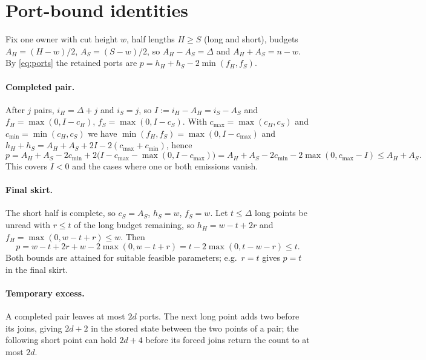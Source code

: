 \section{Port-bound identities}
\label{app:ports}

Fix one owner with cut height $w$, half lengths $H\ge S$ (long and short),
budgets $A_H=(H-w)/2$, $A_S=(S-w)/2$, so $A_H-A_S=\Delta$ and $A_H+A_S=n-w$.
By \eqref{eq:ports} the retained ports are $p=h_H+h_S-2\min(f_H,f_S)$.

\paragraph{Completed pair.}
After $j$ pairs, $i_H=\Delta+j$ and $i_S=j$, so $I:=i_H-A_H=i_S-A_S$ and
$f_H=\max(0,I-c_H)$, $f_S=\max(0,I-c_S)$. With $c_{\max}=\max(c_H,c_S)$ and
$c_{\min}=\min(c_H,c_S)$ we have $\min(f_H,f_S)=\max(0,I-c_{\max})$ and
$h_H+h_S=A_H+A_S+2I-2(c_{\max}+c_{\min})$, hence
\[
 p=A_H+A_S-2c_{\min}+2\bigl(I-c_{\max}-\max(0,I-c_{\max})\bigr)
  =A_H+A_S-2c_{\min}-2\max(0,c_{\max}-I)\le A_H+A_S .
\]
This covers $I<0$ and the cases where one or both emissions vanish.

\paragraph{Final skirt.}
The short half is complete, so $c_S=A_S$, $h_S=w$, $f_S=w$. Let $t\le\Delta$
long points be unread with $r\le t$ of the long budget remaining, so
$h_H=w-t+2r$ and $f_H=\max(0,w-t+r)\le w$. Then
\[
 p=w-t+2r+w-2\max(0,w-t+r)=t-2\max(0,t-w-r)\le t .
\]
Both bounds are attained for suitable feasible parameters; e.g.\ $r=t$ gives
$p=t$ in the final skirt.

\paragraph{Temporary excess.}
A completed pair leaves at most $2d$ ports. The next long point adds two before
its joins, giving $2d+2$ in the stored state between the two points of a pair;
the following short point can hold $2d+4$ before its forced joins return the
count to at most $2d$.

\clearpage
